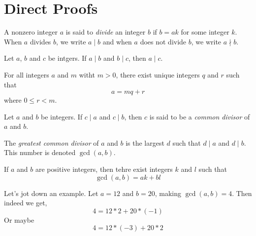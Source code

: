 \chapter{Direct Proofs}

\begin{definition}
	\label{div}
	A nonzero integer $a$ is said to \emph{divide} an integer $b$ if $b = ak$ for some integer $k$. When $a$ divides $b$, we write $a \mid b$ and when $a$ does not divide $b$, we write $a \nmid b$.
\end{definition}

\begin{proposition} \label{transdiv}
	Let $a$, $b$ and $c$ be intgers. If $a \mid b$ and $b \mid c$, then $a \mid c$.
\end{proposition}

\begin{theorem} \label{divalgo}
	For all integers $a$ and $m$ witht $m > 0$, there exist unique integers $q$ and $r$ such that 
	$$a = mq+r$$
	where $0 \leq r < m$.
\end{theorem}

\begin{definition} \label{gcd}
	Let $a$ and $b$ be integers. If $c \mid a$ and $c \mid b$, then $c$ is said to be a \emph{common divisor} of $a$ and $b$.

	The \emph{greatest common divisor} of $a$ and $b$ is the largest $d$ such that $d \mid a$ and $d \mid b$. This number is denoted $\gcd(a,b)$.
\end{definition}

\begin{theorem}
	If $a$ and $b$ are positive integers, then tehre exist integers $k$ and $l$ such that $$\gcd(a,b) = ak + bl$$
\end{theorem}

\begin{scratch}
Let's jot down an example. Let $a = 12$ and $b = 20$, making $\gcd(a, b) = 4$.
Then indeed we get, $$4 = 12*2 + 20*(-1)$$
Or maybe $$4 = 12*(-3) + 20*2$$
\end{scratch}

